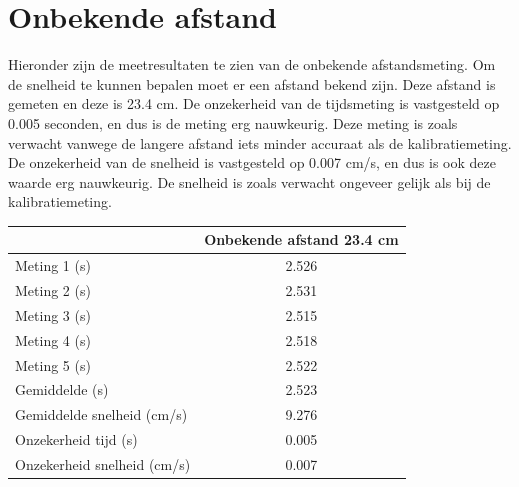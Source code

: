 \documentclass{report}
\begin{document}
\section{Onbekende afstand}
Hieronder zijn de meetresultaten te zien van de onbekende afstandsmeting. Om de snelheid te kunnen bepalen moet er een afstand bekend zijn. Deze afstand is gemeten en deze is 23.4 cm. De onzekerheid van de tijdsmeting is vastgesteld op 0.005 seconden, en dus is de meting erg nauwkeurig. Deze meting is zoals verwacht vanwege de langere afstand iets minder accuraat als de kalibratiemeting. De onzekerheid van de snelheid is vastgesteld op 0.007 cm/s, en dus is ook deze waarde erg nauwkeurig. De snelheid is zoals verwacht ongeveer gelijk als bij de kalibratiemeting.
\begin{center}
\begin{tabular}{| l| c|}
\hline
    & Onbekende afstand 23.4 cm\\
\hline
   Meting 1 (s) & 2.526 \\
\hline
   Meting 2 (s) & 2.531 \\
\hline
   Meting 3 (s) & 2.515 \\
\hline
   Meting 4 (s) & 2.518 \\
\hline
   Meting 5 (s) & 2.522 \\
\hline
   Gemiddelde (s) & 2.523 \\
\hline
   Gemiddelde snelheid (cm/s) & 9.276 \\
\hline
   Onzekerheid tijd (s) & 0.005 \\
\hline
   Onzekerheid snelheid (cm/s) & 0.007 \\
\hline
 \end{tabular}
\end{center}
\end{document}
